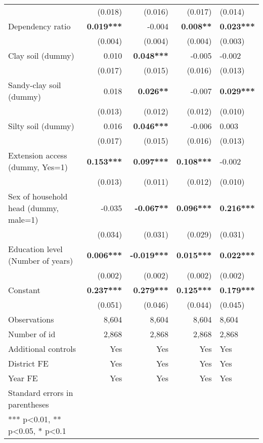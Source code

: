 \documentclass[
]{article}
\begin{document}
\begin{landscape}
\begin{longtable}[t]{lrrrl}
\addlinespace
 & (0.018) & (0.016) & (0.017) & (0.014)\\
Dependency ratio & \textbf{0.019***} & -0.004 & \textbf{0.008**} & \textbf{0.023***}\\
 & (0.004) & (0.004) & (0.004) & (0.003)\\
Clay soil (dummy) & 0.010 & \textbf{0.048***} & -0.005 & -0.002\\
 & (0.017) & (0.015) & (0.016) & \vphantom{1} (0.013)\\
\addlinespace
Sandy-clay soil (dummy) & 0.018 & \textbf{0.026**} & -0.007 & \textbf{0.029***}\\
 & (0.013) & (0.012) & (0.012) & (0.010)\\
Silty soil (dummy) & 0.016 & \textbf{0.046***} & -0.006 & 0.003\\
 & (0.017) & (0.015) & (0.016) & (0.013)\\
Extension access (dummy, Yes=1) & \textbf{0.153***} & \textbf{0.097***} & \textbf{0.108***} & -0.002\\
\addlinespace
 & (0.013) & (0.011) & (0.012) & (0.010)\\
Sex of household head (dummy, male=1) & -0.035 & \textbf{-0.067**} & \textbf{0.096***} & \textbf{0.216***}\\
 & (0.034) & (0.031) & (0.029) & (0.031)\\
Education level (Number of years) & \textbf{0.006***} & \textbf{-0.019***} & \textbf{0.015***} & \textbf{0.022***}\\
 & (0.002) & (0.002) & (0.002) & (0.002)\\
\addlinespace
Constant & \textbf{0.237***} & \textbf{0.279***} & \textbf{0.125***} & \textbf{0.179***}\\
 & (0.051) & (0.046) & (0.044) & (0.045)\\
\midrule
Observations & 8,604 & 8,604 & 8,604 & 8,604\\
Number of id & 2,868 & 2,868 & 2,868 & 2,868\\
Additional controls & Yes & Yes & Yes & Yes\\
\addlinespace
District FE & Yes & Yes & Yes & Yes\\
Year FE & Yes & Yes & Yes & Yes\\
\midrule
Standard errors in parentheses &  &  &  & \\
*** p<0.01, ** p<0.05, * p<0.1 &  &  &  & \\*
\end{longtable}
\end{landscape}
\endgroup{}
\end{document}
